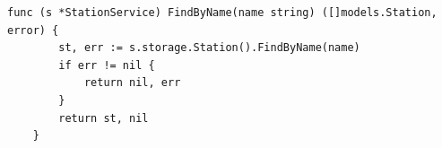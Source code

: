 \begin{lstlisting}[label=list:service_read_station_FindByName,caption=Serwis wyszukiwania stacji ładowania według nazwy.,basicstyle=\tiny\ttfamily]
    func (s *StationService) FindByName(name string) ([]models.Station, error) {
        st, err := s.storage.Station().FindByName(name)
        if err != nil {
            return nil, err
        }
        return st, nil
    }
\end{lstlisting}
